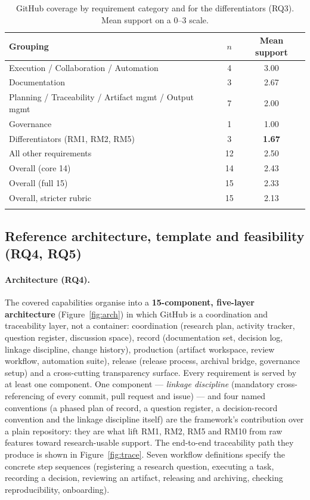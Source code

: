 \documentclass[pdflatex,sn-mathphys-num]{sn-jnl}%
\begin{document}
\begin{table}[h]
\caption{GitHub coverage by requirement category and for the differentiators (RQ3). Mean support on a 0--3 scale.}\label{tab:coverage}
\begin{tabular}{@{}lcc@{}}
\toprule
Grouping & $n$ & Mean support \\
\midrule
Execution / Collaboration / Automation & 4 & 3.00 \\
Documentation                          & 3 & 2.67 \\
Planning / Traceability / Artifact mgmt / Output mgmt & 7 & 2.00 \\
Governance                             & 1 & 1.00 \\
\midrule
Differentiators (RM1, RM2, RM5)        & 3 & \textbf{1.67} \\
All other requirements                 & 12 & 2.50 \\
\midrule
Overall (core 14) & 14 & 2.43 \\
Overall (full 15) & 15 & 2.33 \\
Overall, stricter rubric & 15 & 2.13 \\
\botrule
\end{tabular}
\end{table}

\subsection{Reference architecture, template and feasibility (RQ4, RQ5)}\label{sec:r-arch}

\paragraph{Architecture (RQ4).} The covered capabilities organise into a \textbf{15-component, five-layer architecture} (Figure~\ref{fig:arch}) in which GitHub is a coordination and traceability layer, not a container: coordination (research plan, activity tracker, question register, discussion space), record (documentation set, decision log, linkage discipline, change history), production (artifact workspace, review workflow, automation suite), release (release process, archival bridge, governance setup) and a cross-cutting transparency surface. Every requirement is served by at least one component. One component --- \emph{linkage discipline} (mandatory cross-referencing of every commit, pull request and issue) --- and four named conventions (a phased plan of record, a question register, a decision-record convention and the linkage discipline itself) are the framework's contribution over a plain repository: they are what lift RM1, RM2, RM5 and RM10 from raw features toward research-usable support. The end-to-end traceability path they produce is shown in Figure~\ref{fig:trace}. Seven workflow definitions specify the concrete step sequences (registering a research question, executing a task, recording a decision, reviewing an artifact, releasing and archiving, checking reproducibility, onboarding).
\end{document}
